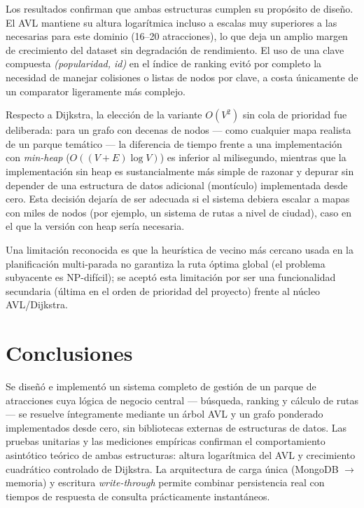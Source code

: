 \documentclass[conference]{IEEEtran}
\begin{document}
Los resultados confirman que ambas estructuras cumplen su prop\'osito de
dise\~no. El AVL mantiene su altura logar\'itmica incluso a escalas muy
superiores a las necesarias para este dominio (16--20 atracciones), lo que
deja un amplio margen de crecimiento del dataset sin degradaci\'on de
rendimiento. El uso de una clave compuesta \emph{(popularidad, id)} en el
\'indice de ranking evit\'o por completo la necesidad de manejar colisiones o
listas de nodos por clave, a costa \'unicamente de un comparator ligeramente
m\'as complejo.

Respecto a Dijkstra, la elecci\'on de la variante $O(V^2)$ sin cola de
prioridad fue deliberada: para un grafo con decenas de nodos --- como
cualquier mapa realista de un parque tem\'atico --- la diferencia de tiempo
frente a una implementaci\'on con \emph{min-heap} ($O((V+E)\log V)$) es
inferior al milisegundo, mientras que la implementaci\'on sin heap es
sustancialmente m\'as simple de razonar y depurar sin depender de una
estructura de datos adicional (mont\'iculo) implementada desde cero. Esta
decisi\'on dejar\'ia de ser adecuada si el sistema debiera escalar a mapas
con miles de nodos (por ejemplo, un sistema de rutas a nivel de ciudad), caso
en el que la versi\'on con heap ser\'ia necesaria.

Una limitaci\'on reconocida es que la heur\'istica de vecino m\'as cercano
usada en la planificaci\'on multi-parada no garantiza la ruta \'optima global
(el problema subyacente es NP-dif\'icil); se acept\'o esta limitaci\'on por
ser una funcionalidad secundaria (\'ultima en el orden de prioridad del
proyecto) frente al n\'ucleo AVL/Dijkstra.

\section{Conclusiones}

Se dise\~n\'o e implement\'o un sistema completo de gesti\'on de un parque de
atracciones cuya l\'ogica de negocio central --- b\'usqueda, ranking y
c\'alculo de rutas --- se resuelve \'integramente mediante un \'arbol AVL y un
grafo ponderado implementados desde cero, sin bibliotecas externas de
estructuras de datos. Las pruebas unitarias y las mediciones emp\'iricas
confirman el comportamiento asint\'otico te\'orico de ambas estructuras: altura
logar\'itmica del AVL y crecimiento cuadr\'atico controlado de Dijkstra. La
arquitectura de carga \'unica (MongoDB $\to$ memoria) y escritura
\emph{write-through} permite combinar persistencia real con tiempos de
respuesta de consulta pr\'acticamente instant\'aneos.
\end{document}
